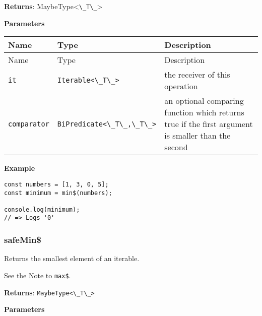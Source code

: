 \textbf{Returns}:
MaybeType\textless{}\passthrough{\lstinline!\_T\_!}\textgreater{}

\textbf{Parameters}

\begin{longtable}[]{
  >{\raggedright\arraybackslash}p{}
  >{\raggedright\arraybackslash}p{}
  >{\raggedright\arraybackslash}p{}@{}}

\toprule\noalign{}
Name & Type & Description \\
\midrule\noalign{}
\endfirsthead
\toprule\noalign{}
Name & Type & Description \\
\midrule\noalign{}
\endhead
\bottomrule\noalign{}
\endlastfoot
\passthrough{\lstinline!it!} & \passthrough{\lstinline!Iterable<\_T\_>!}
& the receiver of this operation \\
\passthrough{\lstinline!comparator!} &
\passthrough{\lstinline!BiPredicate<\_T\_,\_T\_>!} & an optional
comparing function which returns true if the first argument is smaller
than the second \\
\end{longtable}

\textbf{Example}

\begin{lstlisting}[label=572f6b0e-eb5f-40d5-b97e-e94634aa3d6b]
const numbers = [1, 3, 0, 5];
const minimum = min$(numbers);
                              
console.log(minimum);
// => Logs '0'
\end{lstlisting}

\hypertarget{22fcb726-cee7-4692-9189-a7f90875accc}{%
\subsubsection{safeMin\$}\label{22fcb726-cee7-4692-9189-a7f90875accc}}

Returns the smallest element of an iterable.

See the Note to \passthrough{\lstinline!max$!}.

\textbf{Returns}: \passthrough{\lstinline!MaybeType<\_T\_>!}

\textbf{Parameters}

